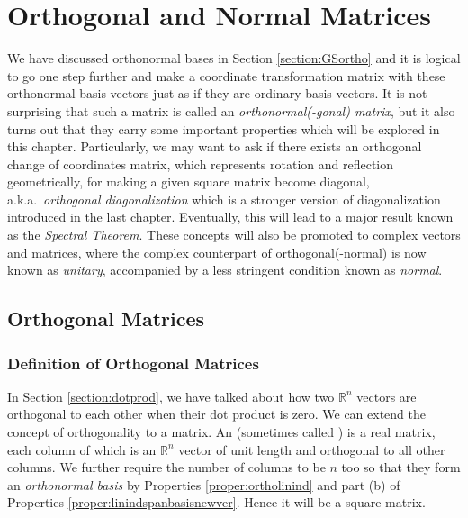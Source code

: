 \chapter{Orthogonal and Normal Matrices}
\label{chap:normalmat}

We have discussed orthonormal bases in Section \ref{section:GSortho} and it is logical to go one step further and make a coordinate transformation matrix with these orthonormal basis vectors just as if they are ordinary basis vectors. It is not surprising that such a matrix is called an \textit{orthonormal(-gonal) matrix}, but it also turns out that they carry some important properties which will be explored in this chapter. Particularly, we may want to ask if there exists an orthogonal change of coordinates matrix, which represents rotation and reflection geometrically, for making a given square matrix become diagonal, a.k.a.\ \textit{orthogonal diagonalization} which is a stronger version of diagonalization introduced in the last chapter. Eventually, this will lead to a major result known as the \textit{Spectral Theorem}. These concepts will also be promoted to complex vectors and matrices, where the complex counterpart of orthogonal(-normal) is now known as \textit{unitary}, accompanied by a less stringent condition known as \textit{normal}. 

\section{Orthogonal Matrices}

\subsection{Definition of Orthogonal Matrices}
In Section \ref{section:dotprod}, we have talked about how two $\mathbb{R}^n$ vectors are orthogonal to each other when their dot product is zero. We can extend the concept of orthogonality to a matrix. An  (sometimes called ) is a real matrix, each column of which is an $\mathbb{R}^n$ vector of unit length and orthogonal to all other columns. We further require the number of columns to be $n$ too so that they form an \textit{orthonormal basis} by Properties \ref{proper:ortholinind} and part (b) of Properties \ref{proper:linindspanbasisnewver}. Hence it will be a square matrix.

